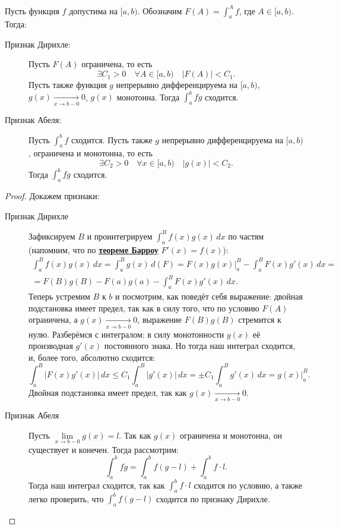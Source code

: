 \begin{theorem}
	Пусть функция \(f\) допустима на \([a, b)\). Обозначим \(F(A) = \int_a^A f\), где \(A \in [a, b)\). Тогда:
	\begin{description}
		\item[Признак Дирихле:] Пусть \(F(A)\) ограничена, то есть \[
		\exists C_1 > 0 \quad \forall A \in [a, b) \quad |F(A)| < C_1.
		\]
		Пусть также функция \(g\) непрерывно дифференцируема на \([a, b)\), \(g(x) \xrightarrow[x \to b-0]{} 0\), \(g(x)\) монотонна. Тогда \(\int_a^b fg\) сходится.
		\item[Признак Абеля:] Пусть \(\int_a^b f\) сходится. Пусть также \(g\) непрерывно дифференцируема на \([a, b)\), ограничена и монотонна, то есть \[
		\exists C_2 > 0 \quad \forall x \in [a, b) \quad |g(x)| < C_2.
		\]
		Тогда \(\int_a^b fg\) сходится. 
	\end{description} 
\end{theorem}
\begin{proof}
	Докажем признаки:
	\begin{description}
		\item[Признак Дирихле] Зафиксируем \(B\) и проинтегрируем \(\displaystyle \int_a^B f(x)g(x) \, dx\) по частям (напомним, что по \hyperlink{t8}{\bfseries теореме Барроу} \(F'(x) = f(x)\)):
		\begin{multline*}
			\int_a^B f(x)g(x) \, dx = \int_a^B g(x) \, d(F) = F(x)g(x) \bigg|_a^B -\int_a^B F(x)g'(x) \, dx = \\
			= F(B)g(B) - F(a)g(a) - \int_a^B F(x)g'(x) \, dx.
		\end{multline*}
		Теперь устремим \(B\) к \(b\) и посмотрим, как поведёт себя выражение: двойная подстановка имеет предел, так как в силу того, что по условию \(F(A)\) ограничена, а \(g(x) \xrightarrow[x \to b-0]{} 0\), выражение \(F(B)g(B)\) стремится к нулю. Разберёмся с интегралом: в силу монотонности \(g(x)\) её производная \(g'(x)\) постоянного знака. Но тогда наш интеграл сходится, и, более того, абсолютно сходится: \[
		\int_a^B |F(x)g'(x)| \, dx \leqslant C_1 \int_a^B |g'(x)| \, dx = \pm C_1 \int_a^B g'(x) \, dx = g(x) \bigg|_a^B.
		\]
		Двойная подстановка имеет предел, так как \(g(x) \xrightarrow[x \to b-0]{} 0\).
		\item[Признак Абеля] Пусть \(\lim\limits_{x \to b-0} g(x) = l\). Так как \(g(x)\) ограничена и монотонна, он существует и конечен. Тогда рассмотрим: \[
		\int_a^b fg = \int_a^b f(g - l) + \int_a^b f \cdot l.
		\]
		Тогда наш интеграл сходится, так как \(\int_a^b f \cdot l\) сходится по условию, а также легко проверить, что \(\int_a^b f(g - l)\) сходится по признаку Дирихле.
	\end{description}
\end{proof}

